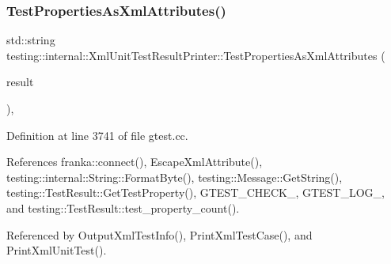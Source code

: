 \subsubsection{\texorpdfstring{Test\+Properties\+As\+Xml\+Attributes()}{TestPropertiesAsXmlAttributes()}}
{\footnotesize\ttfamily std\+::string testing\+::internal\+::\+Xml\+Unit\+Test\+Result\+Printer\+::\+Test\+Properties\+As\+Xml\+Attributes (\begin{DoxyParamCaption}\item[{const \hyperlink{classtesting_1_1TestResult}{Test\+Result} \&}]{result }\end{DoxyParamCaption})\hspace{0.3cm}{\ttfamily [static]}, {\ttfamily [private]}}



Definition at line 3741 of file gtest.\+cc.



References franka\+::connect(), Escape\+Xml\+Attribute(), testing\+::internal\+::\+String\+::\+Format\+Byte(), testing\+::\+Message\+::\+Get\+String(), testing\+::\+Test\+Result\+::\+Get\+Test\+Property(), G\+T\+E\+S\+T\+\_\+\+C\+H\+E\+C\+K\+\_\+, G\+T\+E\+S\+T\+\_\+\+L\+O\+G\+\_\+, and testing\+::\+Test\+Result\+::test\+\_\+property\+\_\+count().



Referenced by Output\+Xml\+Test\+Info(), Print\+Xml\+Test\+Case(), and Print\+Xml\+Unit\+Test().


